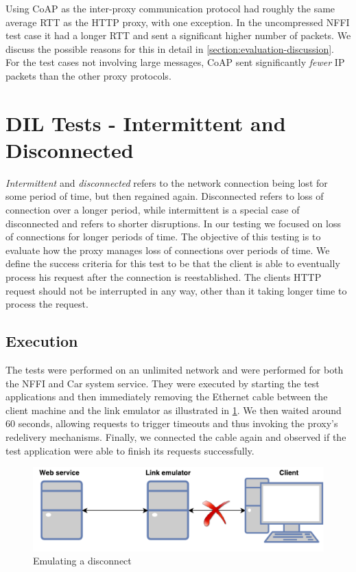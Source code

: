 Using CoAP as the inter-proxy communication protocol had roughly the same
average RTT as the HTTP proxy, with one exception. In the uncompressed NFFI test
case it had a longer RTT and sent a significant higher number of packets. We
discuss the possible reasons for this in detail in
\cref{section:evaluation-discussion}. For the test cases not involving large
messages, CoAP sent significantly \textit{fewer} IP packets than the other proxy
protocols.




\section{DIL Tests - Intermittent and Disconnected}

\textit{Intermittent} and \textit{disconnected} refers to the network connection
being lost for some period of time, but then regained again. Disconnected
refers to loss of connection over a longer period, while intermittent is a
special case of disconnected and refers to shorter disruptions. In our testing
we focused on loss of connections for longer periods of time. The objective of
this testing is to evaluate how the proxy manages loss of connections over
periods of time. We define the success criteria for this test to be that the
client is able to eventually process his request after the connection is
reestablished. The clients HTTP request should not be interrupted in any way,
other than it taking longer time to process the request.

\subsection{Execution}

 The tests were performed on an unlimited network and were performed for both
 the NFFI and Car system service. They were executed by starting the test
 applications and then immediately removing the Ethernet cable between the
 client machine and the link emulator as illustrated in
 \cref{figure-testing-disconncted}. We then waited around 60 seconds, allowing
 requests to trigger timeouts and thus invoking the proxy’s redelivery
 mechanisms. Finally, we connected the cable again and observed if the test
 application were able to finish its requests successfully.

 \begin{figure}[h]
 \includegraphics[width=\textwidth]{images/testing_disconnected.pdf}
 \caption{Emulating a disconnect}
 \label{figure-testing-disconncted}
 \end{figure}


